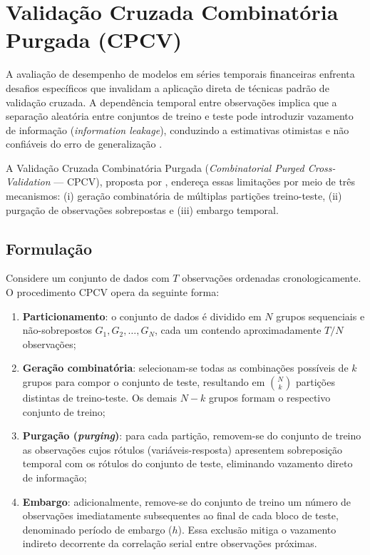 \section{Validação Cruzada Combinatória Purgada (CPCV)}
\label{sec:cpcv}

A avaliação de desempenho de modelos em séries temporais financeiras enfrenta
desafios específicos que invalidam a aplicação direta de técnicas padrão de
validação cruzada. A dependência temporal entre observações implica que a
separação aleatória entre conjuntos de treino e teste pode introduzir
vazamento de informação (\emph{information leakage}), conduzindo a
estimativas otimistas e não confiáveis do erro de
generalização \cite{lopez2018advances}.

A Validação Cruzada Combinatória Purgada (\emph{Combinatorial Purged
Cross-Validation} --- CPCV), proposta por
, endereça essas limitações por meio de três
mecanismos: (i) geração combinatória de múltiplas partições treino-teste,
(ii) purgação de observações sobrepostas e (iii) embargo temporal.

\subsection{Formulação}
\label{subsec:cpcv_formulacao}

Considere um conjunto de dados com $T$ observações ordenadas
cronologicamente. O procedimento CPCV opera da seguinte forma:

\begin{enumerate}
    \item \textbf{Particionamento}: o conjunto de dados é dividido em $N$
          grupos sequenciais e não-sobrepostos
          $G_1, G_2, \ldots, G_N$, cada um contendo aproximadamente
          $T/N$ observações;
    \item \textbf{Geração combinatória}: selecionam-se todas as
          combinações possíveis de $k$ grupos para compor o conjunto de
          teste, resultando em $\binom{N}{k}$ partições distintas de
          treino-teste. Os demais $N-k$ grupos formam o respectivo
          conjunto de treino;
    \item \textbf{Purgação (\emph{purging})}: para cada partição,
          removem-se do conjunto de treino as observações cujos rótulos
          (variáveis-resposta) apresentem sobreposição temporal com os
          rótulos do conjunto de teste, eliminando vazamento direto de
          informação;
    \item \textbf{Embargo}: adicionalmente, remove-se do conjunto de
          treino um número de observações imediatamente subsequentes ao
          final de cada bloco de teste, denominado período de embargo
          ($h$). Essa exclusão mitiga o vazamento indireto decorrente da
          correlação serial entre observações próximas.
\end{enumerate}

